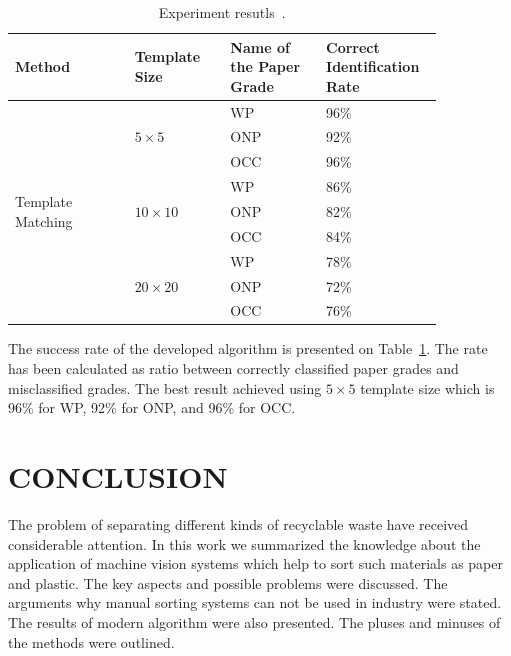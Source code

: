 \documentclass{lutmscthesis}[2010/09/22]
\begin{document}
\begin{table}[hpt]
\begin{center}
\caption{Experiment resutls~\cite{Rahman:2009}.\label{tab:exper}}
{\renewcommand{\arraystretch}{2}
\begin{tabular}{|p{0.25\linewidth}|p{0.2\linewidth}|p{0.2\linewidth}|p{0.2\linewidth}|}

\hline
\textbf{Method}
&
\textbf{Template Size}
&
\textbf{Name of the Paper Grade}
&
\textbf{Correct Identification Rate} \\
\hline

\multirow{9}{*}{Template Matching}
&
\multirow{3}{*}{$5\times5$}
& WP & 96\% \\
\cline{3-4}

&& ONP & 92\% \\
\cline{3-4}

&& OCC & 96\% \\
\cline{2-4}

& \multirow{3}{*}{$10\times10$}
& WP & 86\% \\
\cline{3-4}

&& ONP & 82\% \\
\cline{3-4}

&& OCC & 84\% \\
\cline{2-4}

& \multirow{3}{*}{$20\times20$}
& WP & 78\% \\
\cline{3-4}

&& ONP & 72\% \\
\cline{3-4}

&& OCC & 76\% \\
\hline

\end{tabular}}
\end{center}
\end{table}

The success rate of the developed algorithm is presented on Table~\ref{tab:exper}. The
rate has been calculated as ratio between correctly classified paper grades and
misclassified grades. The best result achieved using $5 \times 5$ template size which
is 96\% for WP, 92\% for ONP, and 96\% for OCC.

\section{ CONCLUSION }
The problem of separating different kinds of recyclable waste have
received considerable attention. In this work we summarized
the knowledge about the application of machine vision systems which
help to sort such materials as paper and plastic. The key aspects and
possible problems were discussed. The arguments why
manual sorting systems can not be used in industry were stated. The results
of modern algorithm were also presented. The pluses and minuses
of the methods were outlined.


\end{document}
